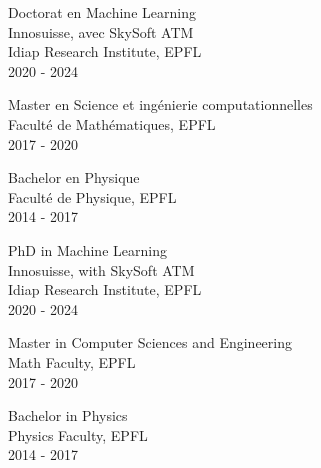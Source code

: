 \ifFrench

  \color{deepgray}
  \large Doctorat en Machine Learning \\
  \color{mediumgray} \small
  Innosuisse, avec SkySoft ATM \\
  Idiap Research Institute, EPFL \\
  2020 - 2024

  \commonvspace
  \color{deepgray}
  \large Master en Science et ingénierie computationnelles \\
  \color{mediumgray} \small
  Faculté de Mathématiques, EPFL \\
  2017 - 2020

  \commonvspace
  \color{deepgray}
  \large Bachelor en Physique \\
  \color{mediumgray} \small
  Faculté de Physique, EPFL \\
  2014 - 2017
\else

  \color{deepgray}
  \large PhD in Machine Learning \\
  \color{mediumgray} \small
  Innosuisse, with SkySoft ATM \\
  Idiap Research Institute, EPFL \\
  2020 - 2024

  \commonvspace
  \color{deepgray}
  \large Master in Computer Sciences and Engineering \\
  \color{mediumgray} \small
  Math Faculty, EPFL \\
  2017 - 2020

  \commonvspace
  \color{deepgray}
  \large Bachelor in Physics \\
  \color{mediumgray} \small
  Physics Faculty, EPFL \\
  2014 - 2017
\fi